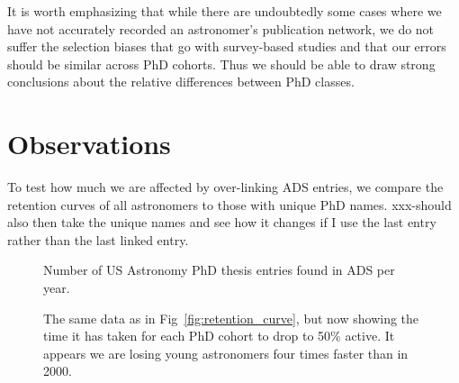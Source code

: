 \documentclass[preprint2]{aastex}
\begin{document}
It is worth emphasizing that while there are undoubtedly some cases where we have not accurately recorded an astronomer's publication network, we do not suffer the selection biases that go with survey-based studies and that our errors should be similar across PhD cohorts.  Thus we should be able to draw strong conclusions about the relative differences between PhD classes.

\section{Observations}

To test how much we are affected by over-linking ADS entries, we compare the retention curves of all astronomers to those with unique PhD names.  xxx-should also then take the unique names and see how it changes if I use the last entry rather than the last linked entry.


\begin{figure}
  \caption{Number of US Astronomy PhD thesis entries found in ADS per year. \label{fig:phdperyear}}
\end{figure}


\begin{figure*}
  \caption{The fraction of Astronomy PhDs still active as first authors on any type of ADS entry (e.g., peer-reviewed journal articles, conference proceedings, grant proposals, arXive papers, etc).  Error bars show ranges computed by comparing the curves to those of authors with unique names and unique names where all records are assumed to be linked.   \label{fig:retention_curve}}
\end{figure*}

\begin{figure}
\caption{The same data as in Fig~\ref{fig:retention_curve}, but now showing the time it has taken for each PhD cohort to drop to 50\% active.  It appears we are losing young astronomers four times faster than in 2000.  \label{fig:retention_50}}
\end{figure}

\end{document}
